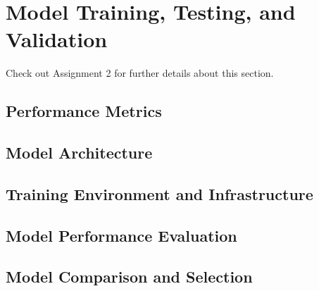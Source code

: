 \section{Model Training, Testing, and Validation}
Check out Assignment 2 for further details about this section.

\subsection{Performance Metrics}

\subsection{Model Architecture}

\subsection{Training Environment and Infrastructure}

\subsection{Model Performance Evaluation}

\subsection{Model Comparison and Selection}